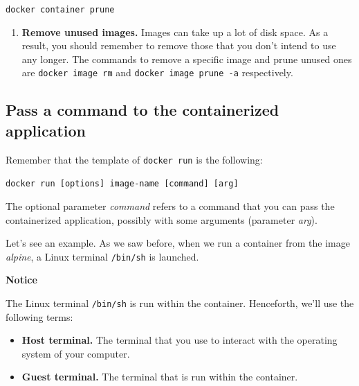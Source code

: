 \documentclass[
]{article}
\providecommand{\tightlist}{%
  \setlength{\itemsep}{0pt}\setlength{\parskip}{0pt}}
\newenvironment{infobox}[1]
  {
  \begin{itemize}
  \renewcommand{\labelitemi}{
    \raisebox{-.7\height}[0pt][0pt]{
      
    }
  }
  \setlength{\fboxsep}{1em}
  \begin{whitebox}
  \item
  }
  {
  \end{whitebox}
  \end{itemize}
  }
\theoremstyle{definition}
\theoremstyle{definition}
\theoremstyle{definition}
\theoremstyle{remark}
\begin{document}
\begin{infobox}{curiosity}
\texttt{docker\ container\ prune}

\begin{enumerate}
\def\labelenumi{\arabic{enumi}.}
\setcounter{enumi}{3}
\tightlist
\item
  \textbf{Remove unused images.} Images can take up a lot of disk space.
  As a result, you should remember to remove those that you don't intend to use
  any longer.
  The commands to remove a specific image
  and prune unused ones are \texttt{docker\ image\ rm}
  and \texttt{docker\ image\ prune\ -a} respectively.
\end{enumerate}

\end{infobox}

\subsection{Pass a command to the containerized application}\label{pass-a-command-to-the-containerized-application}

Remember that the template of \texttt{docker\ run} is the following:

\texttt{docker\ run\ {[}options{]}\ image-name\ {[}command{]}\ {[}arg{]}}

The optional parameter \emph{command} refers to a command
that you can pass the containerized application, possibly with some arguments
(parameter \emph{arg}).

Let's see an example.
As we saw before, when we run a container from the image \emph{alpine},
a Linux terminal \texttt{/bin/sh} is launched.

\begin{infobox}{warning}

\textbf{Notice}

The Linux terminal \texttt{/bin/sh} is run within the
container.
Henceforth, we'll use the following terms:

\begin{itemize}
\tightlist
\item
  \textbf{Host terminal.} The terminal that you use to
  interact with the operating system of your computer.
\end{itemize}

\begin{itemize}
\tightlist
\item
  \textbf{Guest terminal.} The terminal that is run within
  the container.
\end{itemize}

\end{infobox}
\end{document}
